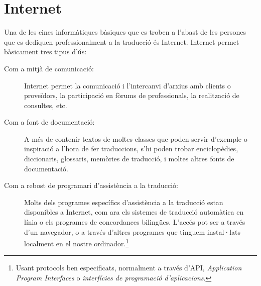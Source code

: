 \chapter{Internet}
\label{se:Internet}

Una de les eines informàtiques bàsiques que es troben a l'abast de les
persones que es dediquen professionalment a la traducció és
Internet. Internet permet bàsicament tres tipus d'ús:
\begin{description}
\item[Com a mitjà de comunicació:] Internet permet la comunicació
  i l'intercanvi d'arxius amb clients o proveïdors, la participació en fòrums de
  professionals, la realització de consultes, etc.
\item[Com a font de documentació:] A més de contenir textos de moltes
  classes que poden servir d'exemple o inspiració a l'hora de fer
  traduccions, s'hi poden trobar enciclopèdies, diccionaris,
  glossaris, memòries de traducció, i moltes altres fonts de
  documentació.
\item[Com a rebost de programari d'assistència a la traducció:] Molts
  dels programes específics d'assistència a la traducció estan
  disponibles a Internet, com ara els sistemes de traducció automàtica
  en línia o els programes de concordances bilingües. L'accés pot ser
  a través d'un navegador, o a través d'altres programes que tinguem
  instal·lats localment en el nostre ordinador.\footnote{Usant
    protocols ben especificats, normalment a través d'API,
    \emph{Application Program Interfaces} o \emph{interfícies de
      programació d'aplicacions}.}
\end{description}



